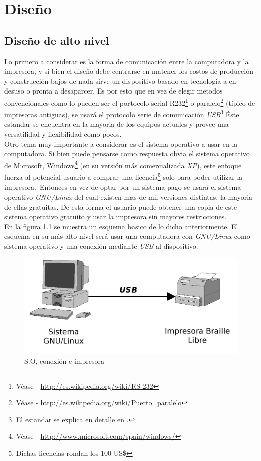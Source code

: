 \chapter{Dise\~no}
%

\section{Dise\~no de alto nivel}
%
Lo primero a considerar es la forma de comunicaci\'on entre la computadora y
la impresora, y si bien el dise\~no debe centrarse en matener los costos de
producci\'on y construcci\'on bajos de nada sirve un dispositivo basado en
tecnolog\'ia a en desuso o pronta a desaparcer. Es por esto que en vez de
elegir metodos convencionales como lo pueden ser el portocolo serial
R232\footnote{V\'ease - \url{http://es.wikipedia.org/wiki/RS-232}} o
paralelo\footnote{V\'ease - \url{http://es.wikipedia.org/wiki/Puerto_paralelo}}
(t\'ipico de impresoras antiguas), se usar\'a el protocolo serie de
comunicaci\'on \emph{USB}\footnote{El estandar se explica en detalle en
.} \'Este estandar se encuentra en la mayoria de los equipos
actuales y provee una versatilidad y flexibilidad como pocos.\\

Otro tema muy importante a considerar es el sistema operativo a usar en la
computadora. Si bien puede pensarse como respuesta obvia el sistema operativo
de Microsoft,
Windows\footnote{V\'ease - \url{http://www.microsoft.com/spain/windows/}} (en
su versi\'on m\'as comercializada \emph{XP}), este enfoque fuerza al potencial
usuario a comprar una licencia\footnote{Dichas licencias rondan los 100 US\$}
solo para poder utilizar la impresora.\
Entonces en vez de optar por un sistema pago se usar\'a el sistema
operativo \emph{GNU/Linux}
del cual existen mas de mil versiones distintas, la mayoria de ellas gratuitas.
De esta forma el usuario puede obtener una copia de este sistema operativo
gratuito y usar la impresora sin mayores restricciones.\\

En la figura \ref{fig:pc_usb_printer} se muestra un esquema basico de lo dicho
anteriormente. El esquema en su m\'as alto nivel ser\'a usar una computadora
con \emph{GNU/Linux} como sistema operativo y una conexi\'on mediante
\emph{USB} al dispositivo.

\begin{figure}[htp]
\centering
\includegraphics[width=13cm]{./img/pc_usb_printer.png}
\caption{S.O, conexi\'on e impresora}
\label{fig:pc_usb_printer}
\end{figure}

